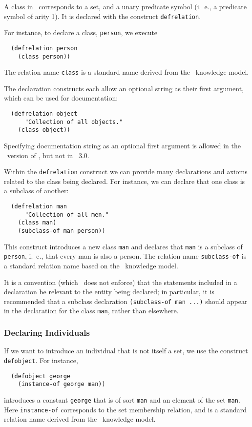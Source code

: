 A class in \kifsnark\  corresponds to  a set, and a unary predicate
symbol (i.\  e., a predicate symbol of arity 1).  It is declared
with the construct \verb'defrelation'.

For instance, to declare a class,
\verb'person', we execute
\begin{verbatim}
  (defrelation person
    (class person))
\end{verbatim}
The relation name \verb'class' is a standard name derived from the \okbc\
knowledge model.

The declaration constructs each allow an optional string as their first
argument, which can be used for documentation:
\begin{verbatim}
  (defrelation object
      "Collection of all objects."
    (class object))
\end{verbatim}
Specifying documentation string as an optional first argument is
allowed in the \ansi\ version of \kif\/, but not in \kif\  3.0.

Within the \verb'defrelation' construct we can provide many declarations and
axioms related to the class being declared.  For instance, we can declare that
one class is a subclass of another:
\begin{verbatim}
  (defrelation man
      "Collection of all men."
    (class man)
    (subclass-of man person))
\end{verbatim}
This construct introduces a new class \verb'man' and declares that
{\tt man} is a subclass of {\tt person}, i.\  e., that every man is
also a person.  The relation name \verb'subclass-of' is a standard
relation name based on the \okbc\   knowledge model.

It is a convention (which \snark\  does not enforce) that the
statements included in a declaration be relevant to the entity being
declared; in particular, it is recommended that a subclass declaration
\verb'(subclass-of man ...)' should appear in the declaration for the class
\verb'man', rather
than elsewhere.


\subsubsection{Declaring Individuals}
\label{subsec-kif-individuals}
If we want to introduce an individual that is not itself a set, we use the
construct \verb'defobject'.  For instance,
\begin{verbatim}
  (defobject george
    (instance-of george man))
\end{verbatim}
introduces a constant \verb'george' that is of sort \verb'man' and an
element of the set \verb'man'.  Here \verb'instance-of' corresponds to
the set membership relation, and is a standard relation name derived
from the \okbc\   knowledge model.

